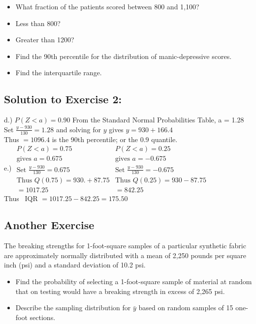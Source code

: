 \documentclass[
  letterpaper,
  DIV=11,
  numbers=noendperiod]{scrartcl}
\begin{document}
\begin{itemize}
\item
  What fraction of the patients scored between 800 and 1,100?
\item
  Less than 800?
\item
  Greater than 1200?
\item
  Find the 90th percentile for the distribution of manic-depressive
  scores.
\item
  Find the interquartile range.
\end{itemize}

\subsection{Solution to Exercise 2:}\label{solution-to-exercise-2}

d.) \(P(Z < a) = 0.90\) From the Standard Normal Probabilities Table, a
= 1.28\\
Set \(\frac{y - 930}{130} = 1.28\) and solving for \(y\) gives
\(y = 930 + 166.4\)\\
Thus \(= 1096.4\) is the 90th percentile; or the 0.9 quantile.\\
e.) \(\begin{array}{l|l}
            P(Z < a) = 0.75 & P(Z < a) = 0.25\\
            \mbox{gives } a = 0.675 & \mbox{gives } a = -0.675\\[.1in]
            \mbox{Set } \frac{y-930}{130} = 0.675 & \mbox{Set } \frac{y-930}{130} = -0.675\\[.1in]
            \mbox{Thus } Q(0.75) = 930. + 87.75 & \mbox{Thus } Q(0.25)= 930 -87.75  \\
            = 1017.25 & = 842.25
            \end{array}\)\\
Thus~ IQR \(= 1017.25- 842.25 = 175.50\)

\subsection{Another Exercise}\label{another-exercise}

The breaking strengths for 1-foot-square samples of a particular
synthetic fabric are approximately normally distributed with a mean of
2,250 pounds per square inch (psi) and a standard deviation of 10.2
psi.\\

\begin{itemize}
\item
  Find the probability of selecting a 1-foot-square sample of material
  at random that on testing would have a breaking strength in excess of
  2,265 psi.
\item
  Describe the sampling distribution for \(\bar{y}\) based on random
  samples of 15 one-foot sections.
\end{itemize}
\end{document}
